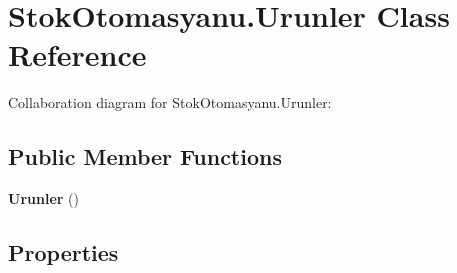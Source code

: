 \section{Stok\+Otomasyanu.\+Urunler Class Reference}
\label{class_stok_otomasyanu_1_1_urunler}


Collaboration diagram for Stok\+Otomasyanu.\+Urunler\+:
\subsection*{Public Member Functions}
\begin{DoxyCompactItemize}
\item 
\textbf{ Urunler} ()
\end{DoxyCompactItemize}
\subsection*{Properties}

